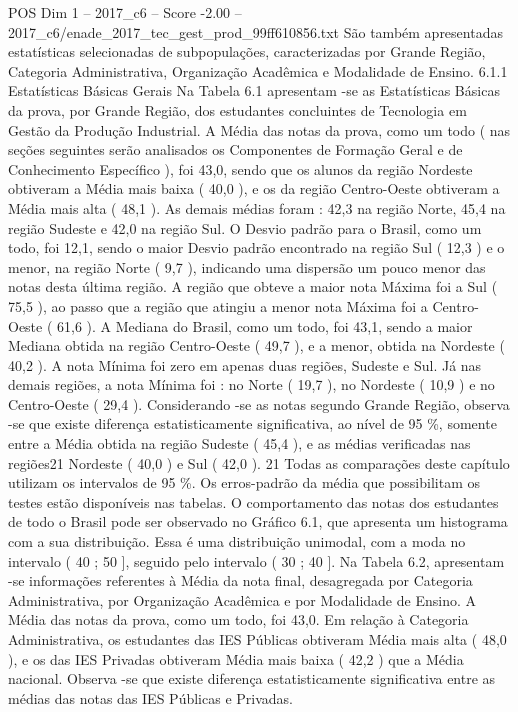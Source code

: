 \begin{textsample}{POS Dim 1 – 2017\_c6 – Score -2.00 – 2017\_c6/enade\_2017\_tec\_gest\_prod\_99ff610856.txt}
São também apresentadas estatísticas selecionadas de subpopulações, caracterizadas por Grande Região, Categoria Administrativa, Organização Acadêmica e Modalidade de Ensino. 6.1.1 Estatísticas Básicas Gerais Na Tabela 6.1 apresentam -se as Estatísticas Básicas da prova, por Grande Região, dos estudantes concluintes de Tecnologia em Gestão da Produção Industrial.
A Média das notas da prova, como um todo ( nas seções seguintes serão analisados os Componentes de Formação Geral e de Conhecimento Específico ), foi 43,0, sendo que os alunos da região Nordeste obtiveram a Média mais baixa ( 40,0 ), e os da região Centro-Oeste obtiveram a Média mais alta ( 48,1 ).
As demais médias foram : 42,3 na região Norte, 45,4 na região Sudeste e 42,0 na região Sul.
O Desvio padrão para o Brasil, como um todo, foi 12,1, sendo o maior Desvio padrão encontrado na região Sul ( 12,3 ) e o menor, na região Norte ( 9,7 ), indicando uma dispersão um pouco menor das notas desta última região.
A região que obteve a maior nota Máxima foi a Sul ( 75,5 ), ao passo que a região que atingiu a menor nota Máxima foi a Centro-Oeste ( 61,6 ).
A Mediana do Brasil, como um todo, foi 43,1, sendo a maior Mediana obtida na região Centro-Oeste ( 49,7 ), e a menor, obtida na Nordeste ( 40,2 ).
A nota Mínima foi zero em apenas duas regiões, Sudeste e Sul.
Já nas demais regiões, a nota Mínima foi : no Norte ( 19,7 ), no Nordeste ( 10,9 ) e no Centro-Oeste ( 29,4 ).
Considerando -se as notas segundo Grande Região, observa -se que existe diferença estatisticamente significativa, ao nível de 95 \%, somente entre a Média obtida na região Sudeste ( 45,4 ), e as médias verificadas nas regiões21 Nordeste ( 40,0 ) e Sul ( 42,0 ). 21 Todas as comparações deste capítulo utilizam os intervalos de 95 \%.
Os erros-padrão da média que possibilitam os testes estão disponíveis nas tabelas.
O comportamento das notas dos estudantes de todo o Brasil pode ser observado no Gráfico 6.1, que apresenta um histograma com a sua distribuição.
Essa é uma distribuição unimodal, com a moda no intervalo ( 40 ; 50 ], seguido pelo intervalo ( 30 ; 40 ].
Na Tabela 6.2, apresentam -se informações referentes à Média da nota final, desagregada por Categoria Administrativa, por Organização Acadêmica e por Modalidade de Ensino.
A Média das notas da prova, como um todo, foi 43,0.
Em relação à Categoria Administrativa, os estudantes das IES Públicas obtiveram Média mais alta ( 48,0 ), e os das IES Privadas obtiveram Média mais baixa ( 42,2 ) que a Média nacional.
Observa -se que existe diferença estatisticamente significativa entre as médias das notas das IES Públicas e Privadas.

\end{textsample}
